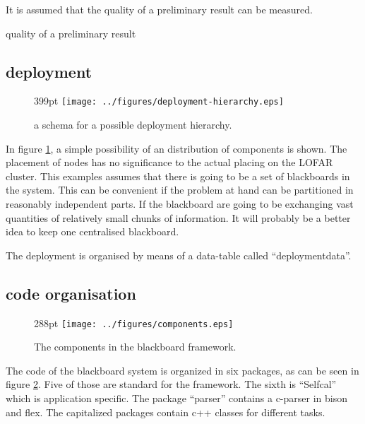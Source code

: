 \documentclass[]{lofar}
\begin{document}
          \begin{assumption}
            It is assumed that the quality of a preliminary result can be
            measured.\footnotemark[\value{footnote}]
            \caption{ quality of a preliminary result\label{ass:quality}}
          \end{assumption}

    \subsection{deployment}

      \begin{figure}{399pt}
        \texttt{[image: ../figures/deployment-hierarchy.eps]}
        \hypertarget{fig:deployment-hierarchy}{}
        \caption{a schema for a possible deployment hierarchy.\label{fig:deployment-hierarchy}}
      \end{figure}

      In figure
      \hyperlink{fig:deployment-hierarchy}{\ref{fig:deployment-hierarchy}},
      a simple possibility of an distribution of components is shown.
      The placement of nodes has no significance to the actual placing
      on the LOFAR cluster. This examples assumes that there is going
      to be a set of blackboards in the system. This can be convenient
      if the problem at hand can be partitioned in reasonably
      independent parts. If the blackboard are going to be exchanging
      vast quantities of relatively small chunks of information. It
      will probably be a better idea to keep one centralised
      blackboard.

      The deployment is organised by means of a data-table called
      ``deploymentdata''.

    \subsection{code organisation}

      \begin{figure}{288pt}
        \texttt{[image: ../figures/components.eps]}
        \hypertarget{fig:components}{}
        \caption{The components in the blackboard framework.\label{fig:components}}
      \end{figure}

      The code of the blackboard system is organized in six packages,
      as can be seen in figure
      \hyperlink{fig:components}{\ref{fig:components}}. Five of those
      are standard for the framework. The sixth is ``Selfcal'' which
      is application specific. The package ``parser'' contains a
      c-parser in bison and flex. The capitalized packages contain c++
      classes for different tasks. 
\end{document}
